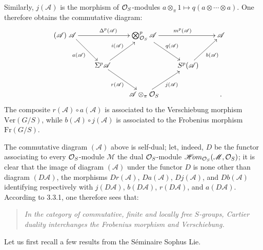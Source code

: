 Similarly, $j(\mathscr A)$ is the morphism of $\mathcal{O}_S$-modules $a\otimes_\pi1\mapsto q(a\otimes\cdots\otimes a)$. One therefore obtains the commutative diagram:
\begin{equation}\tag{$\mathscr A$}
\xymatrix@C=2em@R=2.5em{\mathscr A\ar[rr]^{\Delta^p(\mathscr A)}\ar[dr]_{a(\mathscr A)}&&\bigotimes_{\OS}^p\mathscr A\ar[rr]^{m^p(\mathscr A)}\ar[dr]^{q(\mathscr A)}&&\mathscr A\\
&\Sigma^p\mathscr A\ar[ur]^{i(\mathscr A)}\ar[dr]_{r(\mathscr A)}&&S^p(\mathscr A)\ar[ur]_{b(\mathscr A)}&\\
&&\mathscr A\otimes_\pi\OS\ar[ur]_{j(\mathscr A)}&&.}
\end{equation}
The composite $r(\mathscr A)\circ a(\mathscr A)$ is associated to the Verschiebung morphism $\mathrm{Ver}(G/S)$, while $b(\mathscr A)\circ j(\mathscr A)$ is associated to the Frobenius morphism $\mathrm{Fr}(G/S)$.

The commutative diagram $(\mathscr A)$ above is self-dual; let, indeed, $D$ be the functor associating to every $\mathcal{O}_S$-module $\mathscr M$ the dual $\mathcal{O}_S$-module $\mathscr H\!om_{\mathcal{O}_S}(\mathscr M,\mathcal{O}_S)$; it is clear that the image of diagram $(\mathscr A)$ under the functor $D$ is none other than diagram $(D\mathscr A)$, the morphisms $Dr(\mathscr A)$, $Da(\mathscr A)$, $Dj(\mathscr A)$, and $Db(\mathscr A)$ identifying respectively with $j(D\mathscr A)$, $b(D\mathscr A)$, $r(D\mathscr A)$, and $a(D\mathscr A)$. According to 3.3.1, one therefore sees that:
\begin{quote}\emph{In the category of commutative, finite and locally free $S$-groups, Cartier duality interchanges the Frobenius morphism and Verschiebung.}\end{quote}

Let us first recall a few results from the S\'eminaire Sophus Lie.

